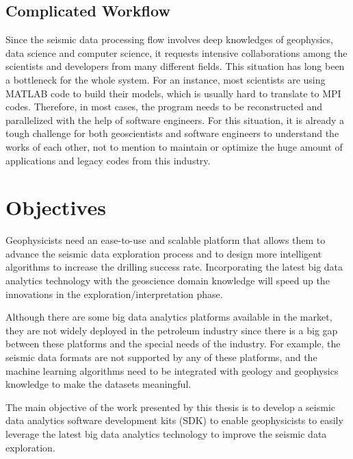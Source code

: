 \subsection{Complicated Workflow}

Since the seismic data processing flow involves deep knowledges of geophysics, data science and computer science, it requests intensive collaborations among the scientists and developers from many different fields. This situation has long been a bottleneck for the whole system. For an instance, most scientists are using MATLAB code to build their models, which is usually hard to translate to MPI codes. Therefore, in most cases, the program needs to be reconstructed and parallelized with the help of software engineers. For this situation, it is already a tough challenge for both geoscientists and software engineers to understand the works of each other, not to mention to maintain or optimize the huge amount of applications and  legacy codes from this industry.


\section{Objectives}

Geophysicists need an ease-to-use and scalable platform that allows them to advance the seismic data exploration process and to design more intelligent algorithms to increase the drilling success rate. Incorporating the latest big data analytics technology with the geoscience domain knowledge will speed up the innovations in the exploration/interpretation phase.

Although there are some big data analytics platforms available in the market, they are not widely deployed in the petroleum industry since there is a big gap between these platforms and the special needs of the industry. For example, the seismic data formats are not supported by any of these platforms, and the machine learning algorithms need to be integrated with geology and geophysics knowledge to make the datasets meaningful.

The main objective of the work presented by this thesis is to develop a seismic data analytics software development kits (SDK) to enable geophysicists to easily leverage the latest big data analytics technology to improve the seismic data exploration.




